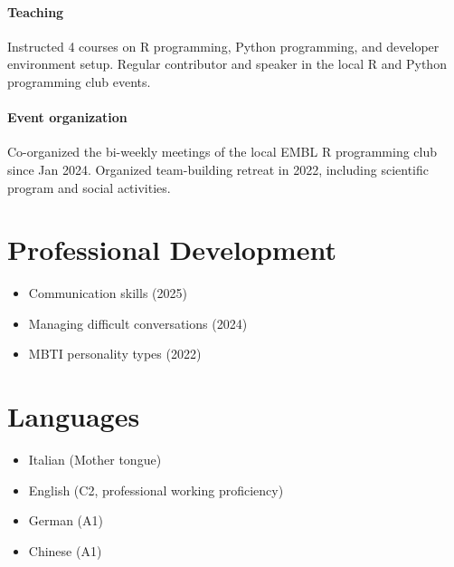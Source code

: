 \documentclass[10pt]{article} %
\begin{document}
\paragraph{Teaching} Instructed 4 courses on R programming, Python programming, and developer environment setup. Regular contributor and speaker in the local R and Python programming club events.

\paragraph{Event organization} Co-organized the bi-weekly meetings of the local EMBL R programming club since Jan 2024. Organized team-building retreat in 2022, including scientific program and social activities.


\section{Professional Development}

\begin{itemize}
	\item Communication skills (2025)
	\item Managing difficult conversations (2024)
	\item MBTI personality types (2022)
\end{itemize}


\section{Languages}

\begin{itemize}
	\item Italian (Mother tongue)
	\item English (C2, professional working proficiency)
	\item German (A1)
	\item Chinese (A1)
\end{itemize}


\nocite{*}
\printbibliography[title=Publications]
\end{document}

